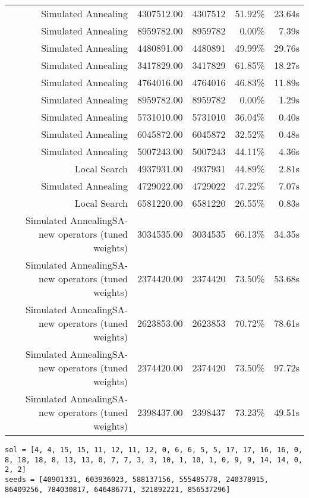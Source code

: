 \begin{table}[ht]
\begin{tabular}{|r|r|r|r|r|}
Simulated Annealing & 4307512.00 & 4307512 & 51.92\% & 23.64s\\
Simulated Annealing & 8959782.00 & 8959782 & 0.00\% & 7.39s\\
Simulated Annealing & 4480891.00 & 4480891 & 49.99\% & 29.76s\\
Simulated Annealing & 3417829.00 & 3417829 & 61.85\% & 18.27s\\
Simulated Annealing & 4764016.00 & 4764016 & 46.83\% & 11.89s\\
Simulated Annealing & 8959782.00 & 8959782 & 0.00\% & 1.29s\\
Simulated Annealing & 5731010.00 & 5731010 & 36.04\% & 0.40s\\
Simulated Annealing & 6045872.00 & 6045872 & 32.52\% & 0.48s\\
Simulated Annealing & 5007243.00 & 5007243 & 44.11\% & 4.36s\\
Local Search & 4937931.00 & 4937931 & 44.89\% & 2.81s\\
Simulated Annealing & 4729022.00 & 4729022 & 47.22\% & 7.07s\\
Local Search & 6581220.00 & 6581220 & 26.55\% & 0.83s\\
Simulated AnnealingSA-new operators (tuned weights) & 3034535.00 & 3034535 & 66.13\% & 34.35s\\
Simulated AnnealingSA-new operators (tuned weights) & 2374420.00 & 2374420 & 73.50\% & 53.68s\\
Simulated AnnealingSA-new operators (tuned weights) & 2623853.00 & 2623853 & 70.72\% & 78.61s\\
Simulated AnnealingSA-new operators (tuned weights) & 2374420.00 & 2374420 & 73.50\% & 97.72s\\
Simulated AnnealingSA-new operators (tuned weights) & 2398437.00 & 2398437 & 73.23\% & 49.51s\\
\end{tabular}%
\end{table}
\begin{lstlisting}[label={lst:call18vehicle5},caption=Optimal solution call\_18\_vehicle\_5]
sol = [4, 4, 15, 15, 11, 12, 11, 12, 0, 6, 6, 5, 5, 17, 17, 16, 16, 0, 8, 18, 18, 8, 13, 13, 0, 7, 7, 3, 3, 10, 1, 10, 1, 0, 9, 9, 14, 14, 0, 2, 2]
seeds = [40901331, 603936023, 588137156, 555485778, 240378915, 86409256, 784030817, 646486771, 321892221, 856537296]
\end{lstlisting}%
\clearpage


